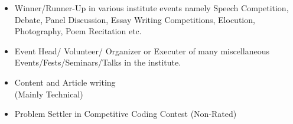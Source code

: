 \begin{itemize}
\item Winner/Runner-Up in various institute events namely Speech Competition, Debate, Panel Discussion, Essay Writing Competitions, Elocution, Photography, Poem Recitation etc.

\divider
\item Event Head/ Volunteer/ Organizer or Executer of many miscellaneous Events/Fests/Seminars/Talks in the institute.

\divider
\item Content and Article writing \\(Mainly Technical)

\divider
\item Problem Settler in Competitive Coding Contest (Non-Rated)

\divider
\end{itemize}